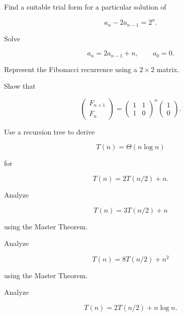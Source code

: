 \begin{exercise}[3]
Find a suitable trial form for a particular solution of

\[
a_n-2a_{n-1}=2^n.
\]
\end{exercise}

\begin{exercise}[3]
Solve

\[
a_n=2a_{n-1}+n,
\qquad
a_0=0.
\]
\end{exercise}

\begin{exercise}[3]
Represent the Fibonacci recurrence using a \(2\times2\) matrix.
\end{exercise}

\begin{exercise}[3]
Show that

\[
\begin{pmatrix}
F_{n+1}\\
F_n
\end{pmatrix}
=
\begin{pmatrix}
1&1\\
1&0
\end{pmatrix}^{n}
\begin{pmatrix}
1\\
0
\end{pmatrix}.
\]
\end{exercise}

\begin{exercise}[3]
Use a recursion tree to derive

\[
T(n)=\Theta(n\log n)
\]

for

\[
T(n)=2T(n/2)+n.
\]
\end{exercise}

\begin{exercise}[3]
Analyze

\[
T(n)=3T(n/2)+n
\]

using the Master Theorem.
\end{exercise}

\begin{exercise}[3]
Analyze

\[
T(n)=8T(n/2)+n^2
\]

using the Master Theorem.
\end{exercise}

\begin{exercise}[3]
Analyze

\[
T(n)=2T(n/2)+n\log n.
\]
\end{exercise}

